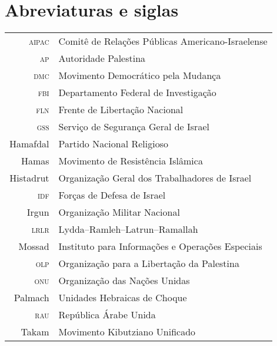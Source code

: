 \chapter{Abreviaturas e siglas}

\begingroup%
\begin{tabular}{rl}
\textsc{aipac} & Comitê de Relações Públicas Americano-Israelense\\
\textsc{ap} & Autoridade Palestina\\
\textsc{dmc} & Movimento Democrático pela Mudança\\
\textsc{fbi} & Departamento Federal de Investigação\\
\textsc{fln} & Frente de Libertação Nacional\\
\textsc{gss} & Serviço de Segurança Geral de Israel\\
Hamafdal & Partido Nacional Religioso\\
Hamas & Movimento de Resistência Islâmica\\
Histadrut & Organização Geral dos Trabalhadores de Israel\\
\textsc{idf} & Forças de Defesa de Israel\\
Irgun & Organização Militar Nacional\\
\textsc{lrlr} & Lydda--Ramleh--Latrun--Ramallah\\
Mossad & Instituto para Informações e Operações Especiais\\
\textsc{olp} & Organização para a Libertação da Palestina\\
\textsc{onu} & Organização das Nações Unidas\\
Palmach & Unidades Hebraicas de Choque\\
\textsc{rau} & República Árabe Unida\\
Takam & Movimento Kibutziano Unificado\\
\end{tabular}
\endgroup